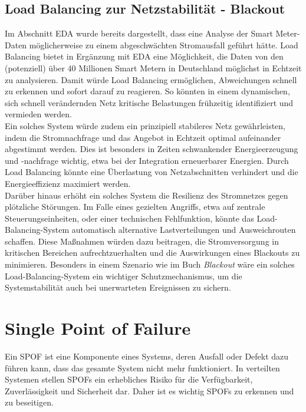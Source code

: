 \documentclass[a4paper,12pt]{article}
\let\stdsection\section
\renewcommand\section{\newpage\stdsection}
\begin{document}
\subsection{Load Balancing zur Netzstabilität - Blackout}
Im Abschnitt EDA wurde bereits dargestellt, dass eine Analyse der Smart Meter-Daten möglicherweise zu einem abgeschwächten Stromausfall geführt hätte. Load Balancing bietet in Ergänzung mit EDA eine Möglichkeit, die Daten von den (potenziell) über 40 Millionen \cite{Haushalte} Smart Metern in Deutschland möglichst in Echtzeit zu analysieren. Damit würde Load Balancing ermöglichen, Abweichungen schnell zu erkennen und sofort darauf zu reagieren. So könnten in einem dynamischen, sich schnell verändernden Netz kritische Belastungen frühzeitig identifiziert und vermieden werden.\\
Ein solches System würde zudem ein prinzipiell stabileres Netz gewährleisten, indem die Stromnachfrage und das Angebot in Echtzeit optimal aufeinander abgestimmt werden. Dies ist besonders in Zeiten schwankender Energieerzeugung und -nachfrage wichtig, etwa bei der Integration erneuerbarer Energien. Durch Load Balancing könnte eine Überlastung von Netzabschnitten verhindert und die Energieeffizienz maximiert werden.\\
Darüber hinaus erhöht ein solches System die Resilienz des Stromnetzes gegen plötzliche Störungen. Im Falle eines gezielten Angriffs, etwa auf zentrale Steuerungseinheiten, oder einer technischen Fehlfunktion, könnte das Load-Balancing-System automatisch alternative Lastverteilungen und Ausweichrouten schaffen. Diese Maßnahmen würden dazu beitragen, die Stromversorgung in kritischen Bereichen aufrechtzuerhalten und die Auswirkungen eines Blackouts zu minimieren. Besonders in einem Szenario wie im Buch \textit{Blackout} wäre ein solches Load-Balancing-System ein wichtiger Schutzmechanismus, um die Systemstabilität auch bei unerwarteten Ereignissen zu sichern.

\section{Single Point of Failure}

Ein SPOF ist eine Komponente eines Systems, deren Ausfall oder Defekt dazu führen kann, dass das gesamte System nicht mehr funktioniert. In verteilten Systemen stellen SPOFs ein erhebliches Risiko für die Verfügbarkeit, Zuverlässigkeit und Sicherheit dar. Daher ist es wichtig SPOFs zu erkennen und zu beseitigen. 
\end{document}
